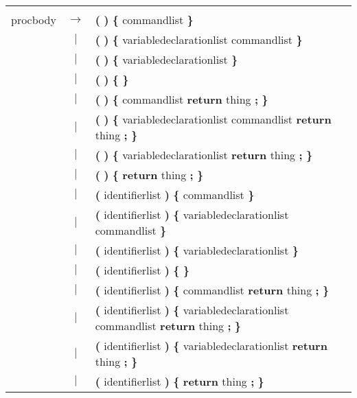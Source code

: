 \begin{tabular}{lcl}
 & & \\
procbody & $\rightarrow$ & \textbf{(} \textbf{)} \textbf{\{} commandlist \textbf{\}} \\
 & $|$ & \textbf{(} \textbf{)} \textbf{\{} variabledeclarationlist commandlist \textbf{\}} \\
 & $|$ & \textbf{(} \textbf{)} \textbf{\{} variabledeclarationlist \textbf{\}} \\
 & $|$ & \textbf{(} \textbf{)} \textbf{\{} \textbf{\}} \\
 & $|$ & \textbf{(} \textbf{)} \textbf{\{} commandlist \textbf{return} thing \textbf{;} \textbf{\}} \\
 & $|$ & \textbf{(} \textbf{)} \textbf{\{} variabledeclarationlist commandlist \textbf{return} thing \textbf{;} \textbf{\}} \\
 & $|$ & \textbf{(} \textbf{)} \textbf{\{} variabledeclarationlist \textbf{return} thing \textbf{;} \textbf{\}} \\
 & $|$ & \textbf{(} \textbf{)} \textbf{\{} \textbf{return} thing \textbf{;} \textbf{\}} \\
 & $|$ & \textbf{(} identifierlist \textbf{)} \textbf{\{} commandlist \textbf{\}} \\
 & $|$ & \textbf{(} identifierlist \textbf{)} \textbf{\{} variabledeclarationlist commandlist \textbf{\}} \\
 & $|$ & \textbf{(} identifierlist \textbf{)} \textbf{\{} variabledeclarationlist \textbf{\}} \\
 & $|$ & \textbf{(} identifierlist \textbf{)} \textbf{\{} \textbf{\}} \\
 & $|$ & \textbf{(} identifierlist \textbf{)} \textbf{\{} commandlist \textbf{return} thing \textbf{;} \textbf{\}} \\
 & $|$ & \textbf{(} identifierlist \textbf{)} \textbf{\{} variabledeclarationlist commandlist \textbf{return} thing \textbf{;} \textbf{\}} \\
 & $|$ & \textbf{(} identifierlist \textbf{)} \textbf{\{} variabledeclarationlist \textbf{return} thing \textbf{;} \textbf{\}} \\
 & $|$ & \textbf{(} identifierlist \textbf{)} \textbf{\{} \textbf{return} thing \textbf{;} \textbf{\}} \\
\end{tabular}\\
